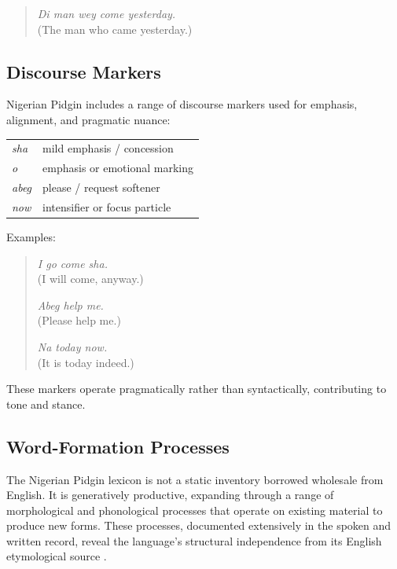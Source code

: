 \documentclass[12pt]{article}
\begin{document}
\begin{quote}
\textit{Di man wey come yesterday.} \\
(The man who came yesterday.)
\end{quote}

\subsection{Discourse Markers}

Nigerian Pidgin includes a range of discourse markers used for emphasis, alignment, and pragmatic nuance:

\begin{center}
\begin{tabular}{ll}
\textit{sha} & mild emphasis / concession \\
\textit{o} & emphasis or emotional marking \\
\textit{abeg} & please / request softener \\
\textit{now} & intensifier or focus particle \\
\end{tabular}
\end{center}

Examples:

\begin{quote}
\textit{I go come sha.} \\
(I will come, anyway.)

\textit{Abeg help me.} \\
(Please help me.)

\textit{Na today now.} \\
(It is today indeed.)
\end{quote}

These markers operate pragmatically rather than syntactically, contributing to tone and stance.

\subsection{Word-Formation Processes}

The Nigerian Pidgin lexicon is not a static inventory borrowed wholesale from English. It is generatively productive, expanding through a range of morphological and phonological processes that operate on existing material to produce new forms. These processes, documented extensively in the spoken and written record, reveal the language's structural independence from its English etymological source \cite{AmadiKilani2021}.
\end{document}
